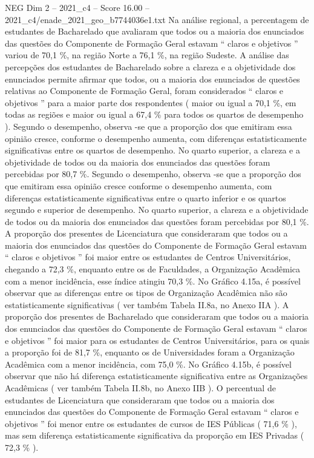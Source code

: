 \begin{textsample}{NEG Dim 2 – 2021\_c4 – Score 16.00 – 2021\_c4/enade\_2021\_geo\_b7744036e1.txt}
Na análise regional, a percentagem de estudantes de Bacharelado que avaliaram que todos ou a maioria dos enunciados das questões do Componente de Formação Geral estavam “ claros e objetivos ” variou de 70,1 \%, na região Norte a 76,1 \%, na região Sudeste.
A análise das percepções dos estudantes de Bacharelado sobre a clareza e a objetividade dos enunciados permite afirmar que todos, ou a maioria dos enunciados de questões relativas ao Componente de Formação Geral, foram considerados “ claros e objetivos ” para a maior parte dos respondentes ( maior ou igual a 70,1 \%, em todas as regiões e maior ou igual a 67,4 \% para todos os quartos de desempenho ).
Segundo o desempenho, observa -se que a proporção dos que emitiram essa opinião cresce, conforme o desempenho aumenta, com diferenças estatisticamente significativas entre os quartos de desempenho.
No quarto superior, a clareza e a objetividade de todos ou da maioria dos enunciados das questões foram percebidas por 80,7 \%.
Segundo o desempenho, observa -se que a proporção dos que emitiram essa opinião cresce conforme o desempenho aumenta, com diferenças estatisticamente significativas entre o quarto inferior e os quartos segundo e superior de desempenho.
No quarto superior, a clareza e a objetividade de todos ou da maioria dos enunciados das questões foram percebidas por 80,1 \%.
A proporção dos presentes de Licenciatura que consideraram que todos ou a maioria dos enunciados das questões do Componente de Formação Geral estavam “ claros e objetivos ” foi maior entre os estudantes de Centros Universitários, chegando a 72,3 \%, enquanto entre os de Faculdades, a Organização Acadêmica com a menor incidência, esse índice atingiu 70,3 \%.
No Gráfico 4.15a, é possível observar que as diferenças entre os tipos de Organização Acadêmica não são estatisticamente significativas ( ver também Tabela II.8a, no Anexo IIA ).
A proporção dos presentes de Bacharelado que consideraram que todos ou a maioria dos enunciados das questões do Componente de Formação Geral estavam “ claros e objetivos ” foi maior para os estudantes de Centros Universitários, para os quais a proporção foi de 81,7 \%, enquanto os de Universidades foram a Organização Acadêmica com a menor incidência, com 75,0 \%.
No Gráfico 4.15b, é possível observar que não há diferença estatisticamente significativa entre as Organizações Acadêmicas ( ver também Tabela II.8b, no Anexo IIB ).
O percentual de estudantes de Licenciatura que consideraram que todos ou a maioria dos enunciados das questões do Componente de Formação Geral estavam “ claros e objetivos ” foi menor entre os estudantes de cursos de IES Públicas ( 71,6 \% ), mas sem diferença estatisticamente significativa da proporção em IES Privadas ( 72,3 \% ).

\end{textsample}
